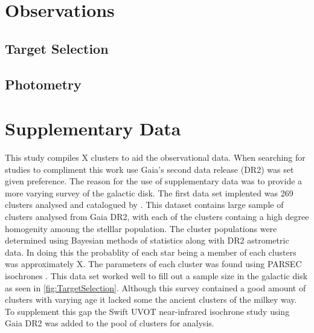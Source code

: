 \section{Observations} 

\subsection{Target Selection}

\begin{figure*}
  \caption{Aitoff projection of targets in terms of galactic co-ordinates, longitude ($l$) and laititude ($b$). Targets observed at CAHA are observed in X, the orginal proposal targets shown in X and studies by \cite{2019A&A...623A.108B} and 
  \label{fig:TargetSelection}}
\end{figure*}
  

\subsection{Photometry}

\section{Supplementary Data}

This study compiles X clusters to aid the observational data. When searching for studies to compliment this work use Gaia's second data release (DR2) was set given preference. The reason for the use of supplementary data was to provide a more varying survey of the galactic disk. The first data set implented was 269 clusters analysed and catalogued by \cite{2019A&A...623A.108B}. This dataset contains large sample of clusters analysed from Gaia DR2, with each of the clusters containg a high degree homogenity amoung the stelllar population. The cluster populations were determined using Bayesian methods of statistics along with DR2 astrometric data. In doing this the probablity of each star being a member of each clusters was approximately X. The parameters of each cluster was found using PARSEC isochrones \citep{2012MNRAS.427..127B}. This data set worked well to fill out a sample size in the galactic disk as seen in \cref{fig:TargetSelection}. Although this survey contained a good amount of clusters with varying age it lacked some the ancient clusters of the milkey way. To supplement this gap the Swift UVOT near-infrared isochrone study using Gaia DR2 \citep{2019yCat..51580035S} was added to the pool of clusters for analysis.

